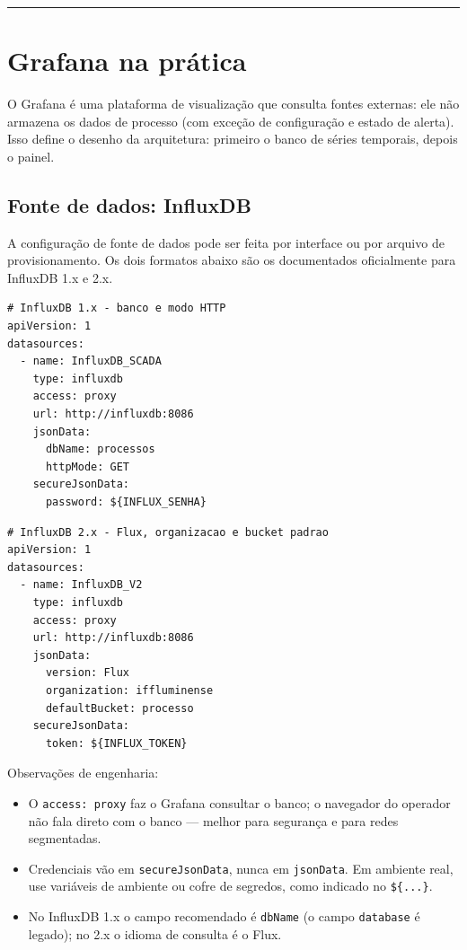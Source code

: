 \begin{center}\rule{0.5\linewidth}{0.5pt}\end{center}

\section{Grafana na prática}\label{grafana-na-pruxe1tica}

O Grafana é uma plataforma de visualização que consulta fontes externas: ele não armazena os dados de processo (com exceção de configuração e estado de alerta). Isso define o desenho da arquitetura: primeiro o banco de séries temporais, depois o painel.

\subsection{Fonte de dados: InfluxDB}\label{fonte-de-dados-influxdb}

A configuração de fonte de dados pode ser feita por interface ou por arquivo de provisionamento. Os dois formatos abaixo são os documentados oficialmente para InfluxDB 1.x e 2.x.

\begin{lstlisting}
# InfluxDB 1.x - banco e modo HTTP
apiVersion: 1
datasources:
  - name: InfluxDB_SCADA
    type: influxdb
    access: proxy
    url: http://influxdb:8086
    jsonData:
      dbName: processos
      httpMode: GET
    secureJsonData:
      password: ${INFLUX_SENHA}
\end{lstlisting}

\begin{lstlisting}
# InfluxDB 2.x - Flux, organizacao e bucket padrao
apiVersion: 1
datasources:
  - name: InfluxDB_V2
    type: influxdb
    access: proxy
    url: http://influxdb:8086
    jsonData:
      version: Flux
      organization: iffluminense
      defaultBucket: processo
    secureJsonData:
      token: ${INFLUX_TOKEN}
\end{lstlisting}

Observações de engenharia:

\begin{itemize}
\tightlist
\item
  O \passthrough{\lstinline!access: proxy!} faz o Grafana consultar o banco; o navegador do operador não fala direto com o banco --- melhor para segurança e para redes segmentadas.
\item
  Credenciais vão em \passthrough{\lstinline!secureJsonData!}, nunca em \passthrough{\lstinline!jsonData!}. Em ambiente real, use variáveis de ambiente ou cofre de segredos, como indicado no \passthrough{\lstinline!$\{...\}!}.
\item
  No InfluxDB 1.x o campo recomendado é \passthrough{\lstinline!dbName!} (o campo \passthrough{\lstinline!database!} é legado); no 2.x o idioma de consulta é o Flux.
\end{itemize}

